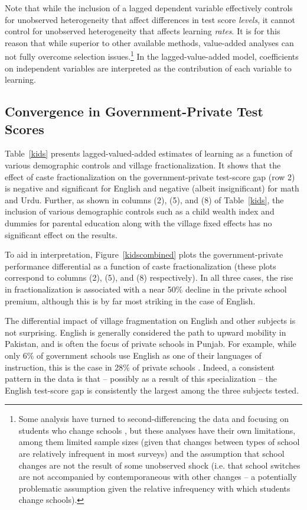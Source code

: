 \documentclass[Eubank_pk_ethnic_sorting.tex]{subfiles}
\begin{document}
Note that while the inclusion of a lagged dependent variable effectively controls for unobserved heterogeneity that affect differences in test score \emph{levels}, it cannot control for unobserved heterogeneity that affects learning \emph{rates}. It is for this reason that while superior to other available methods, value-added analyses can not fully overcome selection issues.\footnote{Some analysis have turned to second-differencing the data and focusing on students who change schools \citep{Andrabi:2011hl}, but these analyses have their own limitations, among them limited sample sizes (given that changes between types of school are relatively infrequent in most surveys) and the assumption that school changes are not the result of some unobserved shock (i.e. that school switches are not accompanied by contemporaneous with other changes -- a potentially problematic assumption given the relative infrequency with which students change schools).} In the lagged-value-added model, coefficients on independent variables are interpreted as the contribution of each variable to learning.

\subsection{Convergence in Government-Private Test Scores}\label{}


Table~\ref{kids} presents lagged-valued-added estimates of learning as a function of various demographic controls and village fractionalization. It shows that the effect of caste fractionalization on the government-private test-score gap (row 2) is negative and significant for English and negative (albeit insignificant) for math and Urdu. Further, as shown in columns (2), (5), and (8) of Table~\ref{kids}, the inclusion of various demographic controls such as a child wealth index and dummies for parental education along with the village fixed effects has no significant effect on the results.




To aid in interpretation, Figure~\ref{kidscombined} plots the government-private performance differential as a function of caste fractionalization (these plots correspond to columns (2), (5), and (8) respectively). In all three cases, the rise in fractionalization is associated with a near 50\% decline in the private school premium, although this is by far most striking in the case of English.

The differential impact of village fragmentation on English and other subjects is not surprising. English is generally considered the path to upward mobility in Pakistan, and is often the focus of private schools in Punjab. For example, while only 6\% of government schools use English as one of their languages of instruction, this is the case in 28\% of private schools \citep[p. 49]{Andrabi:2007we}. Indeed, a consistent pattern in the data is that -- possibly as a result of this specialization -- the English test-score gap is consistently the largest among the three subjects tested. 
\end{document}
